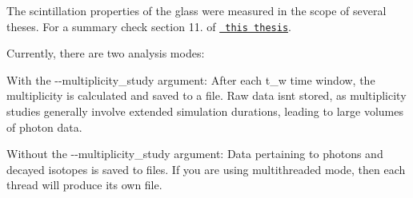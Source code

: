 The scintillation properties of the  glass were measured in the scope of several theses. For a summary check section 11. of \href{https://zenodo.org/record/8121321}{\texttt{ this thesis}}.

Currently, there are two analysis modes\+:


\begin{DoxyEnumerate}
\item With the {\ttfamily -\/-\/multiplicity\+\_\+study} argument\+: After each t\+\_\+w time window, the multiplicity is calculated and saved to a file. Raw data isn\textquotesingle{}t stored, as multiplicity studies generally involve extended simulation durations, leading to large volumes of photon data.
\item Without the {\ttfamily -\/-\/multiplicity\+\_\+study} argument\+: Data pertaining to photons and decayed isotopes is saved to files. If you are using multithreaded mode, then each thread will produce its own file. 
\end{DoxyEnumerate}